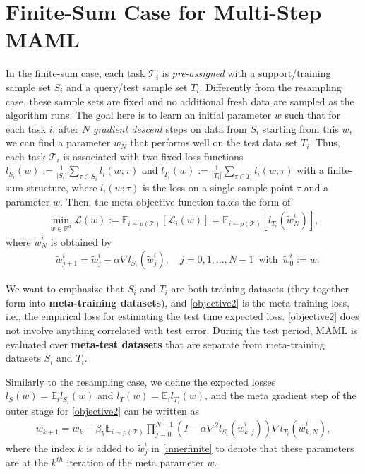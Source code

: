 \documentclass{osudissert96}
\begin{document}
\section{Finite-Sum Case for Multi-Step MAML}\label{app:finitesum}
In the finite-sum case, each task $\mathcal{T}_i$ is {\em pre-assigned} with a support/training sample set $S_i$ and a query/test sample set $T_i$. Differently from the resampling case, these sample sets are fixed and no additional fresh data are sampled as the algorithm runs. The goal here is to learn an initial parameter $w$ such that for each task $i$, after $N$ {\em gradient descent} steps on data from $S_i$ starting from this $w$, we can find a parameter $w_N$ that performs well on the test data set $T_i$. Thus, each task $\mathcal{T}_i$ is associated with two fixed loss functions { $l_{S_i}(w):= \frac{1}{|S_i|}\sum_{\tau \in S_i} l_i(w; \tau)$} and { $l_{T_i}(w):= \frac{1}{|T_i|}\sum_{\tau \in T_i} l_i(w; \tau)$} with a finite-sum structure, where $l_i(w; \tau)$ is the loss on a single sample point $\tau$ and a parameter $w$.  Then, the meta objective function takes the form of 
\begin{align}\label{objective2}
\min_{w\in\mathbb{R}^d} \mathcal{L}(w):= \mathbb{E}_{i\sim p(\mathcal{T})} [\mathcal{L}_i(w)] =  \mathbb{E}_{i\sim p(\mathcal{T})} [l_{T_i}(\widetilde w^i_N)], 
\end{align}
where $\widetilde w^i_N$ is obtained by %
\begin{align}\label{innerfinite}
&\widetilde w^i_{j+1} = \widetilde w^i_j - \alpha \nabla l_{S_i}(\widetilde w^i_j),  \quad j = 0, 1,..., N-1 \, \text{ with }\, \widetilde w^i_0 := w.
\end{align} %

We want to emphasize that  $S_i$ and $T_i$ are both training datasets (they together form into {\bf meta-training datasets}), and \cref{objective2} is the  meta-training loss, i.e., the empirical loss for estimating the test time expected loss. \cref{objective2} does not involve anything correlated with test error. During the test period, MAML is evaluated over {\bf meta-test datasets} that are separate from meta-training datasets $S_i$ and $T_i$. 



Similarly to the resampling case, we define  the expected losses  $l_S(w)=\mathbb{E}_{i} l_{S_i}(w)$  and $l_T(w)=\mathbb{E}_{i} l_{T_i}(w)$, and the meta gradient step of the outer stage for \cref{objective2} can be written as 
\begin{align}\label{fulll_updd}
w_{k+1}  = w_k - \beta_k \mathbb{E}_{i\sim p(\mathcal{T})}\prod_{j=0}^{N-1}(I-\alpha \nabla^2 l_{S_i}(\widetilde w^i_{k,j}))\nabla l_{T_i}(\widetilde w^i _{k,N}),
\end{align}
where the index $k$ is added to $\widetilde w^i_{j}$ in \cref{innerfinite} to denote that these parameters are at the $k^{th}$ iteration of the meta parameter $w$.
 
\end{document}

